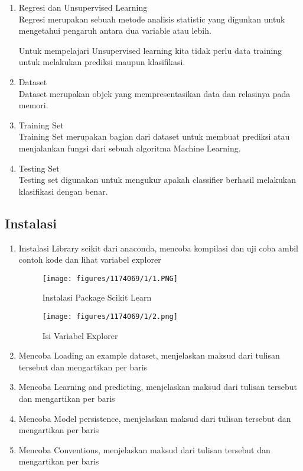 \begin{enumerate}
\item Regresi dan Unsupervised Learning\\
Regresi merupakan sebuah metode analisis statistic yang digunkan untuk mengetahui pengaruh antara dua variable atau lebih.

Untuk mempelajari Unsupervised learning kita tidak perlu data training untuk melakukan prediksi maupun klasifikasi.

\item Dataset\\
Dataset merupakan objek yang mempresentasikan data dan relasinya pada memori.

\item Training Set\\
Training Set merupakan bagian dari dataset untuk membuat prediksi atau menjalankan fungsi dari sebuah algoritma Machine Learning.

\item Testing Set\\
Testing set digunakan untuk mengukur apakah classifier berhasil melakukan klasifikasi dengan benar.

\end{enumerate}

\subsection{Instalasi}
\begin{enumerate}
	\item Instalasi Library scikit dari anaconda, mencoba kompilasi dan uji coba ambil contoh kode dan lihat variabel explorer
	\hfill\break
	\begin{figure}[H]
		\texttt{[image: figures/1174069/1/1.PNG]}
		\centering
		\caption{Instalasi Package Scikit Learn}
	\end{figure}
	\begin{figure}[H]
		\texttt{[image: figures/1174069/1/2.png]}
		\centering
		\caption{Isi Variabel Explorer}
	\end{figure}
	\item Mencoba Loading an example dataset, menjelaskan maksud dari tulisan tersebut dan mengartikan           		  per baris
	\hfill\break
	
	\item Mencoba Learning and predicting, menjelaskan maksud dari tulisan tersebut dan mengartikan per  			  baris
	\hfill\break
	
	\item  Mencoba Model persistence, menjelaskan maksud dari tulisan tersebut dan mengartikan per baris
	\hfill\break
	
	\item Mencoba Conventions, menjelaskan maksud dari tulisan tersebut dan mengartikan per baris
	\hfill\break
	
\end{enumerate}

